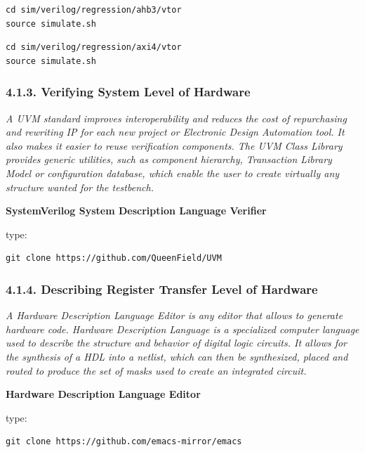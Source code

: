 \documentclass[
]{article}
\begin{document}
\begin{verbatim}
cd sim/verilog/regression/ahb3/vtor
source simulate.sh
\end{verbatim}

\begin{verbatim}
cd sim/verilog/regression/axi4/vtor
source simulate.sh
\end{verbatim}

\hypertarget{verifying-system-level-of-hardware-1}{%
\subsubsection{4.1.3. Verifying System Level of
Hardware}\label{verifying-system-level-of-hardware-1}}

\emph{A UVM standard improves interoperability and reduces the cost of
repurchasing and rewriting IP for each new project or Electronic Design
Automation tool. It also makes it easier to reuse verification
components. The UVM Class Library provides generic utilities, such as
component hierarchy, Transaction Library Model or configuration
database, which enable the user to create virtually any structure wanted
for the testbench.}

\textbf{SystemVerilog System Description Language Verifier}

type:

\begin{verbatim}
git clone https://github.com/QueenField/UVM
\end{verbatim}

\hypertarget{describing-register-transfer-level-of-hardware-1}{%
\subsubsection{4.1.4. Describing Register Transfer Level of
Hardware}\label{describing-register-transfer-level-of-hardware-1}}

\emph{A Hardware Description Language Editor is any editor that allows
to generate hardware code. Hardware Description Language is a
specialized computer language used to describe the structure and
behavior of digital logic circuits. It allows for the synthesis of a HDL
into a netlist, which can then be synthesized, placed and routed to
produce the set of masks used to create an integrated circuit.}

\textbf{Hardware Description Language Editor}

type:

\begin{verbatim}
git clone https://github.com/emacs-mirror/emacs
\end{verbatim}
\end{document}
